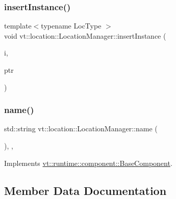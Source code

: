 \subsubsection{\texorpdfstring{insert\+Instance()}{insertInstance()}}
{\footnotesize\ttfamily template$<$typename Loc\+Type $>$ \\
void vt\+::location\+::\+Location\+Manager\+::insert\+Instance (\begin{DoxyParamCaption}\item[{\hyperlink{namespacevt_1_1location_a4db6456e8024af2d23fc5ae560fef866}{Loc\+Inst\+Type} const}]{i,  }\item[{Loc\+Type $\ast$}]{ptr }\end{DoxyParamCaption})\hspace{0.3cm}{\ttfamily [static]}}

\mbox{\label{structvt_1_1location_1_1_location_manager_afdb88906b8c4b5535f239d6581f840e0}} 
\subsubsection{\texorpdfstring{name()}{name()}}
{\footnotesize\ttfamily std\+::string vt\+::location\+::\+Location\+Manager\+::name (\begin{DoxyParamCaption}{ }\end{DoxyParamCaption})\hspace{0.3cm}{\ttfamily [inline]}, {\ttfamily [override]}, {\ttfamily [virtual]}}



Implements \hyperlink{structvt_1_1runtime_1_1component_1_1_base_component_a7701485f3539f78d42e6bad47fc7eb78}{vt\+::runtime\+::component\+::\+Base\+Component}.



\subsection{Member Data Documentation}
\mbox{\label{structvt_1_1location_1_1_location_manager_a748aa3659f6aee39fb0936e694aa74ac}} 
